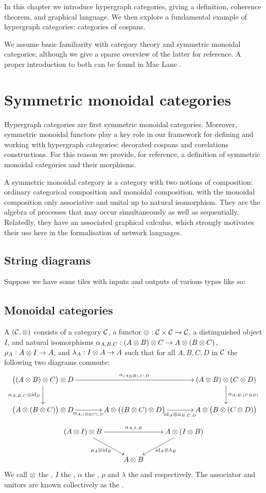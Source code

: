 In this chapter we introduce hypergraph categories, giving a definition,
coherence theorem, and graphical language. We then explore a fundamental example
of hypergraph categories: categories of cospans.

We assume basic familiarity with category theory and symmetric monoidal
categories; although we give a sparse overview of the latter for reference. A
proper introduction to both can be found in Mac Lane \cite{Mac98}.

\section{Symmetric monoidal categories}
Hypergraph categories are first symmetric monoidal categories. Moreover,
symmetric monoidal functors play a key role in our framework for defining and
working with hypergraph categories: decorated cospans and corelations
constructions. For this reason we provide, for reference, a definition of
symmetric monoidal categories and their morphisms. 

A symmetric monoidal category is a category with two notions of composition:
ordinary categorical composition and monoidal composition, with the monoidal
composition only associative and unital up to natural isomorphism. They are the
algebra of processes that may occur simultaneously as well as sequentially.
Relatedly, they have an associated graphical calculus, which strongly motivates
their use here in the formalisation of network languages. 

\subsection{String diagrams}
Suppose we have some tiles with inputs and outputs of various types like so:
\[
  .
\]

\subsection{Monoidal categories}
A  $({\mathcal{C}}, \otimes)$ consists of a category ${\mathcal{C}}$, a
functor $\otimes: {\mathcal{C}} \times {\mathcal{C}} \to {\mathcal{C}}$, a distinguished object $I$, and natural
isomorphisms $\alpha_{A,B,C}: (A \otimes B) \otimes C \to A \otimes (B \otimes C)$,
$\rho_A: A \otimes I  \to A$, and $\lambda_A: I \otimes A \to A$ such that for all
$A,B,C,D$ in $\mathcal C$ the following two diagrams commute: 
\[
  \xymatrixcolsep{3pc}
  \xymatrix{
    \big((A \ot B) \ot C\big) \ot D \ar[d]_{\a_{A,B,C}\ot\idn_D} \ar[rr]^{\a_{(A\ot B),C,D}} 
    &&(A \ot B) \ot (C \ot D) \ar[d]^{\a_{A,B,(C\ot D)}} \\
    \big(A \ot (B\ot C)\big) \ot D \ar[r]_{\a_{A,(B\ot C),D}} 
    & A\ot\big((B \ot C)\ot D\big)\ar[r]_{\idn_A \ot \a_{B,C,D}}
    &A \ot \big(B \ot (C \ot D)\big)
  }
\]
\[
  \xymatrix{
    (A\ot I)\ot B  \ar[rr]^{\a_{A,I,B}} \ar[dr]_{\rho_{A}\ot \idn_B} && A \ot (I \ot B) \ar[dl]^{\idn_A\ot \lambda_B}\\
    & A \ot B \\
  }
\]
We call $\otimes$ the , $I$ the ,
$\alpha$ the , $\rho$ and $\lambda$ the  and
 respectively. The associator and unitors are known
collectively as the .


